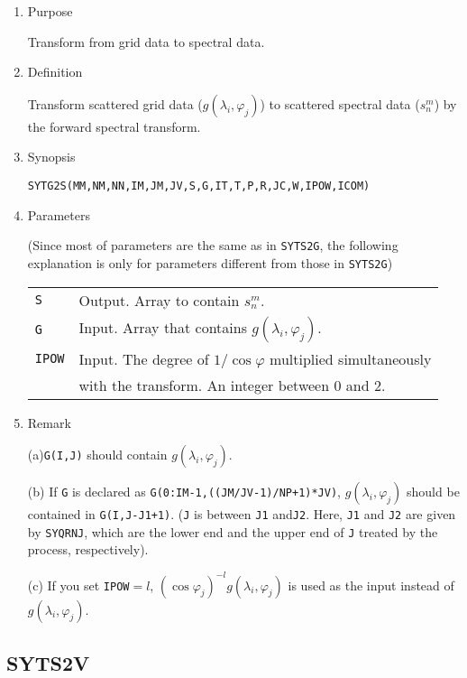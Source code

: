 \documentclass[a4paper]{scrartcl}
\begin{document}
\begin{enumerate}

\item Purpose 

Transform from grid data to spectral data.

\item Definition

Transform scattered grid data ($g(\lambda_i,\varphi_j)$)
to scattered spectral data ($s^m_n$)
by the forward spectral transform.

\item Synopsis 

\texttt{SYTG2S(MM,NM,NN,IM,JM,JV,S,G,IT,T,P,R,JC,W,IPOW,ICOM)}  

\item Parameters

(Since most of parameters are the same as in \texttt{SYTS2G},
the following explanation is only for parameters
different from those in \texttt{SYTS2G})

\begin{tabular}{ll}
\texttt{S} & Output. Array to contain $s^m_n$.\\
\texttt{G} & Input. Array that 
contains $g(\lambda_i,\varphi_j)$.\\
\texttt{IPOW} & Input. 
The degree of $1/\cos\varphi$ multiplied 
simultaneously  \\
&  with the transform. An integer between 0 and 2.
\end{tabular}

\item Remark

(a)\texttt{G(I,J)} should contain $g(\lambda_i,\varphi_j)$.
  
(b) If \texttt{G} is declared as 
\texttt{G(0:IM-1,((JM/JV-1)/NP+1)*JV)},
    $g(\lambda_i,\varphi_j)$ should be contained in \texttt{G(I,J-J1+1)}.
(\texttt{J} is between \texttt{J1} and\texttt{J2}. Here, 
\texttt{J1} and \texttt{J2} are given by \texttt{SYQRNJ},
which are the lower end and the upper end of \texttt{J} treated 
by the process, respectively).

(c) If you set \texttt{IPOW}$=l$, 
$(\cos\varphi_j)^{-l}g(\lambda_i,\varphi_j)$ is used as the input
instead of $g(\lambda_i,\varphi_j)$.
  
   
\end{enumerate}


\subsection{SYTS2V}
\end{document}
